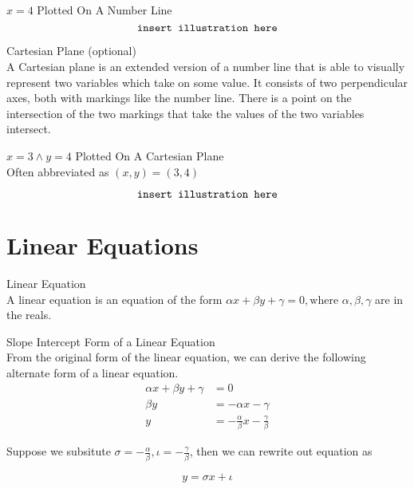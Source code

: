 \documentclass{book}
\begin{document}
  {\example $x = 4$ Plotted On A Number Line\\
    $$\text{\texttt{insert illustration here}}$$
  }

  {\remark Cartesian Plane (optional) \\
    A Cartesian plane is an extended version of a number line that is able to visually represent two variables which take on some value. It consists of two perpendicular axes, both with markings like the number line. There is a point on the intersection of the two markings that take the values of the two variables intersect.\\
  }

  {\example $x = 3 \land y = 4$ Plotted On A Cartesian Plane \\
    Often abbreviated as $(x, y) = (3, 4)$

    $$\text{\texttt{insert illustration here}}$$
  }

  \chapter{Linear Equations}

  {\remark Linear Equation \\
    A linear equation is an equation of the form $\alpha x + \beta y + \gamma = 0, \text{where } \alpha, \beta, \gamma$ are in the reals.\\
  }

  {\remark Slope Intercept Form of a Linear Equation \\
    From the original form of the linear equation, we can derive the following alternate form of a linear equation.
    \begin{align*}
      \alpha x + \beta y + \gamma & = 0\\
      \beta y & = - \alpha x - \gamma\\
      y & = -\frac{\alpha}{\beta} x - \frac{\gamma}{\beta}
    \end{align*}

    Suppose we subsitute $\sigma = - \frac{\alpha}{\beta}, \iota = - \frac{\gamma}{\beta}$, then we can rewrite out equation as

    $$y = \sigma x + \iota$$
  }
\end{document}
